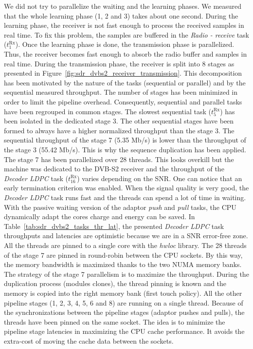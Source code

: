 We did not try to parallelize the waiting and the learning phases. We measured
that the whole learning phase (1, 2 and 3) takes about one second. During the
learning phase, the receiver is not fast enough to process the received samples
in real time. To fix this problem, the samples are buffered in the \emph{Radio -
receive} task ($t^\text{Rx}_{1}$). Once the learning phase is done, the
transmission phase is parallelized. Thus, the receiver becomes fast enough to
absorb the radio buffer and samples in real time. During the transmission phase,
the receiver is split into 8 stages as presented in
Figure~\ref{fig:sdr_dvbs2_receiver_transmission}. This decomposition has been
motivated by the nature of the tasks (sequential or parallel) and by the
sequential measured throughput. The number of stages has been minimized in order
to limit the pipeline overhead. Consequently, sequential and parallel tasks
have been regrouped in common stages. The slowest sequential task
($t^\text{Rx}_{5}$) has been isolated in the dedicated stage 3. The other
sequential stages have been formed to always have a higher normalized throughput
than the stage 3. The sequential throughput of the stage 7 (5.35 Mb/s) is lower
than the throughput of the stage 3 (55.42 Mb/s). This is why the sequence
duplication has been applied. The stage 7 has been parallelized over 28 threads.
This looks overkill but the machine was dedicated to the DVB-S2 receiver
and the throughput of the \emph{Decoder LDPC} task ($t^\text{Rx}_{16}$) varies
depending on the SNR. One can notice that an early termination criterion was
enabled. When the signal quality is very good, the \emph{Decoder LDPC} task runs
fast and the threads can spend a lot of time in waiting. With the passive
waiting version of the adaptor \emph{push} and \emph{pull} tasks, the CPU
dynamically adapt the cores charge and energy can be saved. In
Table~\ref{tab:sdr_dvbs2_tasks_thr_lat}, the presented \emph{Decoder LDPC} task
throughputs and latencies are optimistic because we are in a SNR error-free
zone. All the threads are pinned to a single core with the \emph{hwloc} library.
The 28 threads of the stage 7 are pinned in round-robin between the CPU sockets.
By this way, the memory bandwidth is maximized thanks to the two NUMA memory
banks. The strategy of the stage 7 parallelism is to maximize the throughput.
During the duplication process (modules clones), the thread pinning is known and
the memory is copied into the right memory bank (first touch policy). All the
other pipeline stages (1, 2, 3, 4, 5, 6 and 8) are running on a single thread.
Because of the synchronizations between the pipeline stages (adaptor pushes and
pulls), the threads have been pinned on the same socket. The idea is to minimize
the pipeline stage latencies in maximizing the CPU cache performance. It avoids
the extra-cost of moving the cache data between the sockets.

